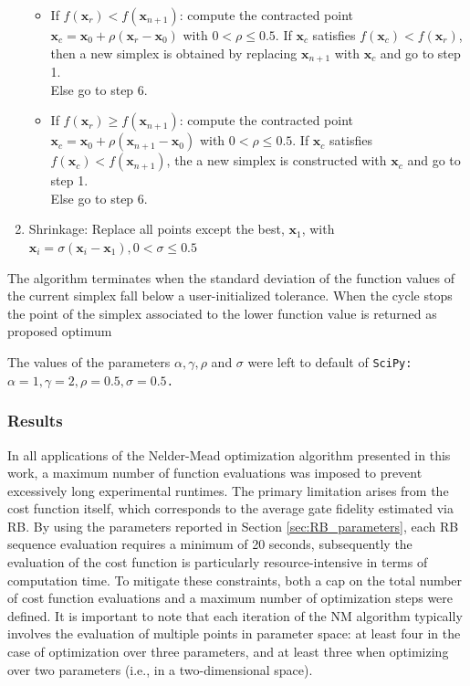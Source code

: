 \begin{enumerate}
\begin{itemize}
        \item If $f(\mathbf{x}_r) < f(\mathbf{x}_{n+1})$: compute the contracted point $\mathbf{x}_c=\mathbf{x}_0 +\rho(\mathbf{x}_{r}-\mathbf{x}_0)$ with $0<\rho \leq 0.5$.
                If $\mathbf{x}_c$ satisfies $f(\mathbf{x}_c) < f(\mathbf{x}_{r})$, then a new simplex is obtained by replacing $\mathbf{x}_{n+1}$ with  $\mathbf{x}_c$ and go to step 1.\\
                Else go to step 6.
        \item  If $f(\mathbf{x}_r) \geq f(\mathbf{x}_{n+1})$: compute the contracted point $\mathbf{x}_c=\mathbf{x}_0 +\rho(\mathbf{x}_{n+1}-\mathbf{x}_0)$ with $0<\rho \leq 0.5$.
                If $\mathbf{x}_c$ satisfies $f(\mathbf{x}_c) < f(\mathbf{x}_{n+1})$, the a new simplex is constructed with $\mathbf{x}_c$ and go to step 1.\\
                Else go to step 6.
    \end{itemize}
    \item Shrinkage: Replace all points except the best, $\mathbf{x}_1$, with $\mathbf{x}_i = \sigma(\mathbf{x}_i - \mathbf{x}_1), 0<\sigma \leq 0.5$  
\end{enumerate}
The algorithm terminates when the standard deviation of the function values of the current simplex fall below a user-initialized tolerance. 
When the cycle stops the point of the simplex associated to the lower function value is returned as proposed optimum

The values of the parameters $\alpha, \gamma, \rho$ and $\sigma$ were left to default of \tt{SciPy}: $\alpha=1, \gamma=2, \rho=0.5, \sigma=0.5$. 

\subsubsection{Results}
In all applications of the Nelder-Mead optimization algorithm presented in this work, a maximum number of function evaluations was imposed to prevent excessively long experimental runtimes. 
The primary limitation arises from the cost function itself, which corresponds to the average gate fidelity estimated via RB. 
By using the parameters reported in Section \ref{sec:RB_parameters}, each RB sequence evaluation requires a minimum of 20 seconds, subsequently the evaluation of the cost function is particularly resource-intensive in terms of computation time.
To mitigate these constraints, both a cap on the total number of cost function evaluations and a maximum number of optimization steps were defined. 
It is important to note that each iteration of the NM algorithm typically involves the evaluation of multiple points in parameter space: at least four in the case of optimization over three parameters, and at least three when optimizing over two parameters (i.e., in a two-dimensional space).

